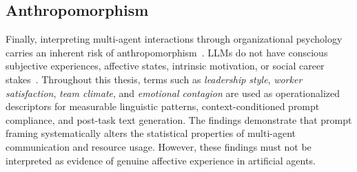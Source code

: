 \subsection{Anthropomorphism}

Finally, interpreting multi-agent interactions through organizational psychology carries an inherent risk of anthropomorphism~\cite{shanahan2023roleplaylargelanguagemodels}.
\acp{LLM} do not have conscious subjective experiences, affective states, intrinsic motivation, or social career stakes~\cite{shanahan2023roleplaylargelanguagemodels}.
Throughout this thesis, terms such as \emph{leadership style}, \emph{worker satisfaction}, \emph{team climate}, and \emph{emotional contagion} are used as operationalized descriptors for measurable linguistic patterns, context-conditioned prompt compliance, and post-task text generation.
The findings demonstrate that prompt framing systematically alters the statistical properties of multi-agent communication and resource usage.
However, these findings must not be interpreted as evidence of genuine affective experience in artificial agents.
